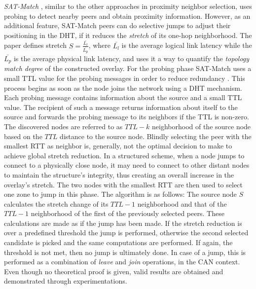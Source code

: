 \emph{SAT-Match} \cite{RGJZ2004}, similar to the other approaches in proximity
neighbor selection, uses probing to detect nearby peers and obtain proximity
information. However, as an additional feature, SAT-Match peers can do selective
jumps to adjust their positioning in the DHT, if it reduces the \emph{stretch}
of its one-hop neighborhood. The paper defines stretch 
$S = \frac{\bar{L_l}}{\bar{L_p}}$, where $\bar{L_l}$ is the average logical link
latency while the $\bar{L_p}$ is the average physical link latency, and uses it
a way to quantify the \emph{topology match degree} of the constructed overlay. For
the probing phase SAT-Match uses a small TTL value for the probing messages in
order to reduce redundancy \cite{jiang_lightflood_2008}. This process begins as
soon as the node joins the network using a DHT mechanism. Each probing message
contains information about the source and a small TTL value. The recipient of
such a message returns information about itself to the source and forwards the
probing message to its neighbors if the TTL is non-zero. The discovered nodes
are referred to as $TTL-k$ neighborhood of the source node based on the $TTL$
distance to the source node. Blindly selecting the peer with the smallest RTT
as neighbor is, generally, not the optimal decision to make to achieve
global stretch reduction. In a structured scheme, when a node jumps to connect
to a physically close node, it may need to connect to other distant nodes to
maintain the structure's integrity, thus creating an overall increase in the
overlay's stretch. The two nodes with the smallest RTT are then used to
select one zone to jump in this phase. The algorithm is as follows: The source
node $S$ calculates the stretch change of its $TTL-1$ neighborhood and that of
the $TTL-1$ neighborhood of the first of the previously selected peers. These
calculations are made as if the jump has been made. If the stretch reduction is
over a predefined threshold the jump is performed, otherwise the second selected
candidate is picked and the same computations are performed. If again, the
threshold is not met, then no jump is ultimately done. In case of a jump, this
is performed as a combination of \emph{leave} and \emph{join} operations, in the
CAN context. Even though no theoretical proof is given, valid results are
obtained and demonstrated through experimentations.

